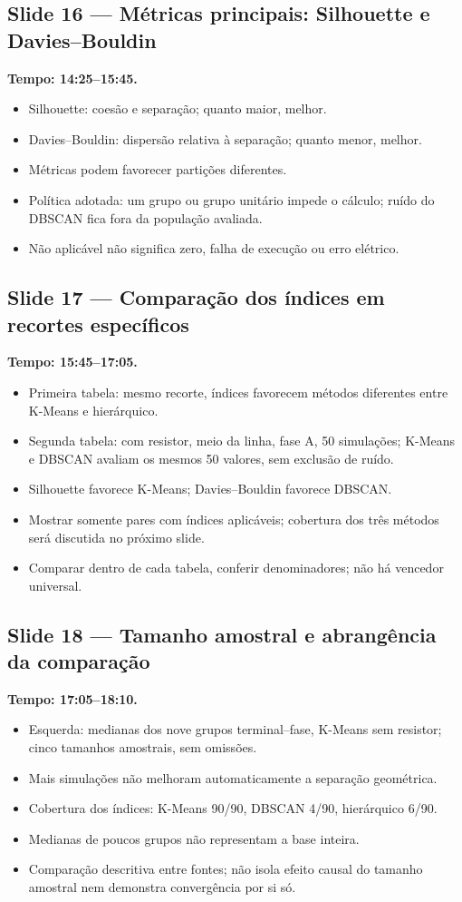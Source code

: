 \documentclass[11pt,a4paper]{article}
\newcommand{\slide}[3]{\Needspace{8\baselineskip}
  \subsection*{Slide #1 --- #2}
  \textbf{Tempo: #3.}\par}
\begin{document}
\slide{16}{Métricas principais: Silhouette e Davies--Bouldin}{14:25--15:45}
\begin{itemize}
\item Silhouette: coesão e separação; quanto maior, melhor.
\item Davies--Bouldin: dispersão relativa à separação; quanto menor, melhor.
\item Métricas podem favorecer partições diferentes.
\item Política adotada: um grupo ou grupo unitário impede o cálculo;
ruído do DBSCAN fica fora da população avaliada.
\item Não aplicável não significa zero, falha de execução ou erro elétrico.
\end{itemize}

\slide{17}{Comparação dos índices em recortes específicos}{15:45--17:05}
\begin{itemize}
\item Primeira tabela: mesmo recorte, índices favorecem métodos diferentes
entre K-Means e hierárquico.
\item Segunda tabela: com resistor, meio da linha, fase A, 50 simulações;
K-Means e DBSCAN avaliam os mesmos 50 valores, sem exclusão de ruído.
\item Silhouette favorece K-Means; Davies--Bouldin favorece DBSCAN.
\item Mostrar somente pares com índices aplicáveis; cobertura dos três
métodos será discutida no próximo slide.
\item Comparar dentro de cada tabela, conferir denominadores;
não há vencedor universal.
\end{itemize}

\slide{18}{Tamanho amostral e abrangência da comparação}{17:05--18:10}
\begin{itemize}
\item Esquerda: medianas dos nove grupos terminal--fase, K-Means sem resistor;
cinco tamanhos amostrais, sem omissões.
\item Mais simulações não melhoram automaticamente a separação geométrica.
\item Cobertura dos índices: K-Means 90/90, DBSCAN 4/90, hierárquico 6/90.
\item Medianas de poucos grupos não representam a base inteira.
\item Comparação descritiva entre fontes; não isola efeito causal do tamanho
amostral nem demonstra convergência por si só.
\end{itemize}
\end{document}
